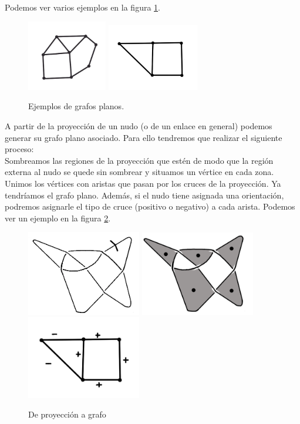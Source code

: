 \documentclass[14pt]{extarticle}
\begin{document}
Podemos ver varios ejemplos en la figura \ref{graf1}.\\
\begin{figure}[h!]
	\centering
	\includegraphics[width=3.5cm]{inudos/grafo.png}
	\includegraphics[width=4cm]{inudos/pgrafo.png}
	\caption{Ejemplos de grafos planos.}
	\label{graf1} 
\end{figure}

A partir de la proyección de un nudo (o de un enlace en general) podemos generar su grafo plano asociado. Para ello tendremos que realizar el siguiente proceso:\\

Sombreamos las regiones de la proyección que estén de modo que la región externa al nudo se quede sin sombrear y situamos un vértice en cada zona. Unimos los vértices con aristas que pasan por los cruces de la proyección. Ya tendríamos el grafo plano. Además, si el nudo tiene asignada una orientación, podremos asignarle el tipo de cruce (positivo o negativo) a cada arista. Podemos ver un ejemplo en la figura \ref{graf2}.\\
\begin{figure}[h!]
	\centering
	\includegraphics[width=5cm]{inudos/pgrafo3.png}
	\includegraphics[width=5cm]{inudos/pgrafo2.png}
	\includegraphics[width=5cm]{inudos/pgrafo1.png}
	\caption{De proyección a grafo}
	\label{graf2} 
\end{figure}
\end{document}
